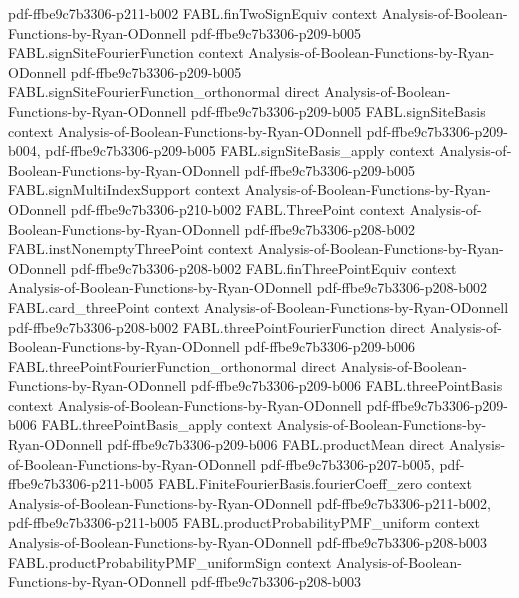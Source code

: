 \begin{theorem}
  {pdf-ffbe9c7b3306-p211-b002}
\proofstep
  {FABL.finTwoSignEquiv}
  {context}
  {Analysis-of-Boolean-Functions-by-Ryan-ODonnell}
  {pdf-ffbe9c7b3306-p209-b005}
\proofstep
  {FABL.signSiteFourierFunction}
  {context}
  {Analysis-of-Boolean-Functions-by-Ryan-ODonnell}
  {pdf-ffbe9c7b3306-p209-b005}
\proofstep
  {FABL.signSiteFourierFunction_orthonormal}
  {direct}
  {Analysis-of-Boolean-Functions-by-Ryan-ODonnell}
  {pdf-ffbe9c7b3306-p209-b005}
\proofstep
  {FABL.signSiteBasis}
  {context}
  {Analysis-of-Boolean-Functions-by-Ryan-ODonnell}
  {pdf-ffbe9c7b3306-p209-b004,
    pdf-ffbe9c7b3306-p209-b005}
\proofstep
  {FABL.signSiteBasis_apply}
  {context}
  {Analysis-of-Boolean-Functions-by-Ryan-ODonnell}
  {pdf-ffbe9c7b3306-p209-b005}
\proofstep
  {FABL.signMultiIndexSupport}
  {context}
  {Analysis-of-Boolean-Functions-by-Ryan-ODonnell}
  {pdf-ffbe9c7b3306-p210-b002}
\proofstep
  {FABL.ThreePoint}
  {context}
  {Analysis-of-Boolean-Functions-by-Ryan-ODonnell}
  {pdf-ffbe9c7b3306-p208-b002}
\proofstep
  {FABL.instNonemptyThreePoint}
  {context}
  {Analysis-of-Boolean-Functions-by-Ryan-ODonnell}
  {pdf-ffbe9c7b3306-p208-b002}
\proofstep
  {FABL.finThreePointEquiv}
  {context}
  {Analysis-of-Boolean-Functions-by-Ryan-ODonnell}
  {pdf-ffbe9c7b3306-p208-b002}
\proofstep
  {FABL.card_threePoint}
  {context}
  {Analysis-of-Boolean-Functions-by-Ryan-ODonnell}
  {pdf-ffbe9c7b3306-p208-b002}
\proofstep
  {FABL.threePointFourierFunction}
  {direct}
  {Analysis-of-Boolean-Functions-by-Ryan-ODonnell}
  {pdf-ffbe9c7b3306-p209-b006}
\proofstep
  {FABL.threePointFourierFunction_orthonormal}
  {direct}
  {Analysis-of-Boolean-Functions-by-Ryan-ODonnell}
  {pdf-ffbe9c7b3306-p209-b006}
\proofstep
  {FABL.threePointBasis}
  {context}
  {Analysis-of-Boolean-Functions-by-Ryan-ODonnell}
  {pdf-ffbe9c7b3306-p209-b006}
\proofstep
  {FABL.threePointBasis_apply}
  {context}
  {Analysis-of-Boolean-Functions-by-Ryan-ODonnell}
  {pdf-ffbe9c7b3306-p209-b006}
\proofstep
  {FABL.productMean}
  {direct}
  {Analysis-of-Boolean-Functions-by-Ryan-ODonnell}
  {pdf-ffbe9c7b3306-p207-b005,
    pdf-ffbe9c7b3306-p211-b005}
\proofstep
  {FABL.FiniteFourierBasis.fourierCoeff_zero}
  {context}
  {Analysis-of-Boolean-Functions-by-Ryan-ODonnell}
  {pdf-ffbe9c7b3306-p211-b002,
    pdf-ffbe9c7b3306-p211-b005}
\proofstep
  {FABL.productProbabilityPMF_uniform}
  {context}
  {Analysis-of-Boolean-Functions-by-Ryan-ODonnell}
  {pdf-ffbe9c7b3306-p208-b003}
\proofstep
  {FABL.productProbabilityPMF_uniformSign}
  {context}
  {Analysis-of-Boolean-Functions-by-Ryan-ODonnell}
  {pdf-ffbe9c7b3306-p208-b003}
\proofstep

\end{theorem}
